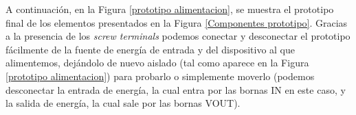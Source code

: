 \documentclass[12pt]{article}
\begin{document}
	\noindent A continuación, en la Figura \ref{prototipo alimentacion}, se muestra el prototipo final de los elementos presentados en la Figura \ref{Componentes prototipo}. Gracias a la presencia de los \textit{screw terminals} podemos conectar y desconectar el prototipo fácilmente de la fuente de energía de entrada y del dispositivo al que alimentemos, dejándolo de nuevo aislado (tal como aparece en la Figura \ref{prototipo alimentacion}) para probarlo o simplemente moverlo (podemos desconectar la entrada de energía, la cual entra por las bornas IN en este caso, y la salida de energía, la cual sale por las bornas VOUT). \\
	
	
\end{document}
